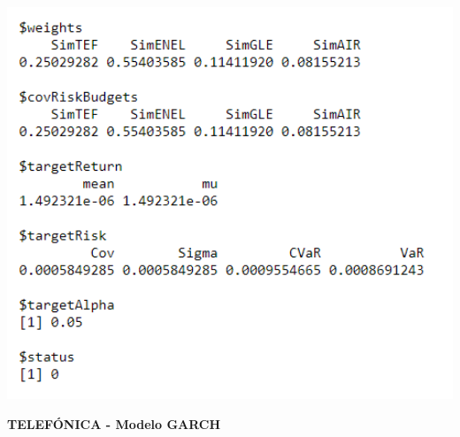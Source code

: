 \documentclass[
  12pt,
  a4paper,
  openany]{book}
\begin{document}
\begin{center}
\begin{minipage}{0.90\linewidth}
    \centering
    \includegraphics[width=2\textwidth]{image/ewmaport.png}
\end{minipage}
\end{center}

\newpage

\begin{center}
 {\normalfont\Large\bfseries TELEFÓNICA - Modelo GARCH}
\end{center}
\end{document}

